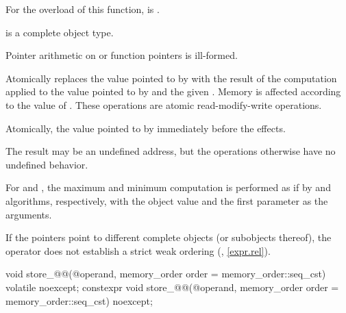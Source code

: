 \begin{itemdescr}
\pnum
\constraints
For the  overload of this function,
 is .

\pnum
\mandates
{} is a complete object type.
\begin{note}
Pointer arithmetic on  or function pointers is ill-formed.
\end{note}

\pnum
\effects
Atomically replaces the value pointed to by
 with the result of the computation applied to the
value pointed to by  and the given .
Memory is affected according to the value of .
These operations are atomic read-modify-write operations.

\pnum
\returns
Atomically, the value pointed to by  immediately before the effects.

\pnum
\remarks
The result may be an undefined address,
but the operations otherwise have no undefined behavior.

\pnum
For  and , the maximum and minimum
computation is performed as if by  and 
algorithms, respectively, with the object value and the first
parameter as the arguments.

\begin{note}
If the pointers point to different complete objects (or subobjects thereof),
the \tcode{<} operator does not establish a strict weak ordering
(, \ref{expr.rel}).
\end{note}
\end{itemdescr}

%
%
%
%
%
%
%
%
%
%
%
%
\begin{itemdecl}
void store_@@(@\seeabovenc@ operand, memory_order order = memory_order::seq_cst) volatile noexcept;
constexpr void store_@@(@\seeabovenc@ operand, memory_order order = memory_order::seq_cst) noexcept;
\end{itemdecl}

